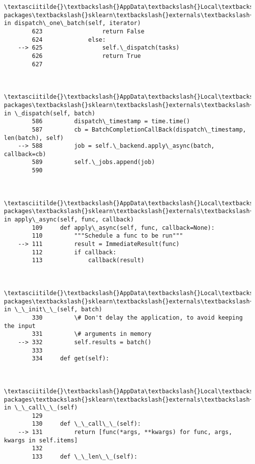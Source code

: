 \documentclass[11pt]{article}
\begin{document}
\begin{Verbatim}[commandchars=\\\{\}]
        \textasciitilde{}\textbackslash{}AppData\textbackslash{}Local\textbackslash{}Continuum\textbackslash{}anaconda3\textbackslash{}lib\textbackslash{}site-packages\textbackslash{}sklearn\textbackslash{}externals\textbackslash{}joblib\textbackslash{}parallel.py in dispatch\_one\_batch(self, iterator)
        623                 return False
        624             else:
    --> 625                 self.\_dispatch(tasks)
        626                 return True
        627 
    

        \textasciitilde{}\textbackslash{}AppData\textbackslash{}Local\textbackslash{}Continuum\textbackslash{}anaconda3\textbackslash{}lib\textbackslash{}site-packages\textbackslash{}sklearn\textbackslash{}externals\textbackslash{}joblib\textbackslash{}parallel.py in \_dispatch(self, batch)
        586         dispatch\_timestamp = time.time()
        587         cb = BatchCompletionCallBack(dispatch\_timestamp, len(batch), self)
    --> 588         job = self.\_backend.apply\_async(batch, callback=cb)
        589         self.\_jobs.append(job)
        590 
    

        \textasciitilde{}\textbackslash{}AppData\textbackslash{}Local\textbackslash{}Continuum\textbackslash{}anaconda3\textbackslash{}lib\textbackslash{}site-packages\textbackslash{}sklearn\textbackslash{}externals\textbackslash{}joblib\textbackslash{}\_parallel\_backends.py in apply\_async(self, func, callback)
        109     def apply\_async(self, func, callback=None):
        110         """Schedule a func to be run"""
    --> 111         result = ImmediateResult(func)
        112         if callback:
        113             callback(result)
    

        \textasciitilde{}\textbackslash{}AppData\textbackslash{}Local\textbackslash{}Continuum\textbackslash{}anaconda3\textbackslash{}lib\textbackslash{}site-packages\textbackslash{}sklearn\textbackslash{}externals\textbackslash{}joblib\textbackslash{}\_parallel\_backends.py in \_\_init\_\_(self, batch)
        330         \# Don't delay the application, to avoid keeping the input
        331         \# arguments in memory
    --> 332         self.results = batch()
        333 
        334     def get(self):
    

        \textasciitilde{}\textbackslash{}AppData\textbackslash{}Local\textbackslash{}Continuum\textbackslash{}anaconda3\textbackslash{}lib\textbackslash{}site-packages\textbackslash{}sklearn\textbackslash{}externals\textbackslash{}joblib\textbackslash{}parallel.py in \_\_call\_\_(self)
        129 
        130     def \_\_call\_\_(self):
    --> 131         return [func(*args, **kwargs) for func, args, kwargs in self.items]
        132 
        133     def \_\_len\_\_(self):
    


\end{Verbatim}
\end{document}
